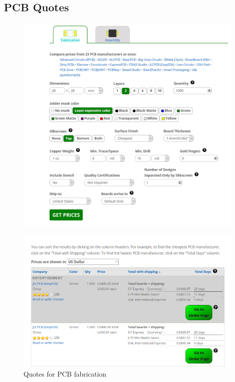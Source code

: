 \documentclass[12pt]{article}
\begin{document}
		\subsection*{PCB Quotes}
		\begin{figure}[H]
			\centering
			\includegraphics[width=\textwidth]{quote1.png}
		\end{figure}
		\begin{figure}[H]
		\centering
		\includegraphics[width=\textwidth]{quote2.png}
		\caption{Quotes for PCB fabrication}
		\end{figure}
		
\end{document}
